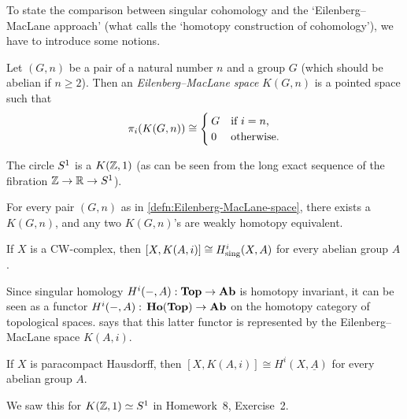 To state the comparison between singular cohomology and the `Eilenberg--MacLane approach' (what \cite{hatcherAlgebraicTopology2002} calls the `homotopy construction of cohomology'), we have to introduce some notions.

\begin{defn}\label{defn:Eilenberg-MacLane-space}
Let \((G,n)\) be a pair of a natural number \(n\) and a group \(G\) (which should be abelian if \(n\geq 2\)).
Then an \emph{Eilenberg--MacLane space} \(K(G,n)\) is a pointed space such that
\[ \homotopy[i](K(G,n)) \cong
  \begin{cases}
    G & \text{if } i = n\text{,} \\
    0 & \text{otherwise.}
  \end{cases}
\]
\end{defn}

\begin{exmp}
The circle \(\sphere[1]\) is a \(K(\mathbb{Z},1)\) (as can be seen from the long exact sequence of the fibration \(\bb Z\to\bb R\to\sphere[1]\)).
\end{exmp}

\begin{thm}[name={\cite[Proposition~4.30]{hatcherAlgebraicTopology2002}}]
For every pair \((G,n)\) as in \cref{defn:Eilenberg-MacLane-space}, there exists a \(K(G,n)\), and any two \(K(G,n)\)'s are weakly homotopy equivalent.
\end{thm}

\begin{prop}[name={representability of singular cohomology~\cite[Theorem 4.57]{hatcherAlgebraicTopology2002}}]\label{prop:representability-of-singular-cohomology}
If \(X\) is a CW-complex, then \([X,K(A,i)]\cong H^i_{\smash{\textup{sing}}}(X,A)\) for every abelian group \(A\).
\end{prop}

\begin{rmk}
Since singular homology \(H^i(-,A)\colon\catTopologicalSpace\to\catAbelianGroup\) is homotopy invariant, it can be seen as a functor \(H^i(-,A)\colon\catHomotopy(\catTopologicalSpace)\to\catAbelianGroup\) on the homotopy category of topological spaces.
 says that this latter functor is represented by the Eilenberg--MacLane space \(K(A,i)\).
\end{rmk}

\begin{prop}\label{prop:comparison-sheaf-cohomology-Eilenberg-MacLane}
If \(X\) is paracompact Hausdorff, then \([X,K(A,i)]\cong H^i(X,\underline{A})\) for every abelian group \(A\).
\end{prop}
We saw this for \(K(\bb Z,1)\simeq\sphere[1]\) in Homework~8, Exercise~2.

